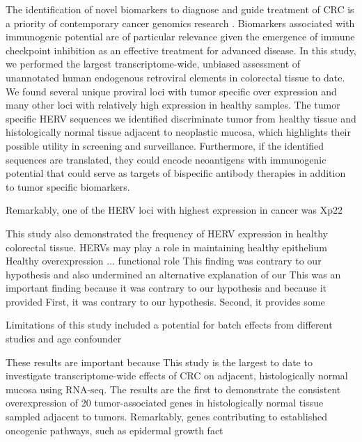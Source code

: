 The identification of novel biomarkers to diagnose and guide treatment of CRC is a priority of contemporary cancer genomics research \citep{Sveen2019}.
Biomarkers associated with immunogenic potential are of particular relevance given the emergence of immune checkpoint inhibition as an effective treatment for advanced disease.
In this study, we performed the largest transcriptome-wide, unbiased assessment of unannotated human endogenous retroviral elements in colorectal tissue to date.
We found several unique proviral loci with tumor specific over expression and many other loci with relatively high expression in healthy samples.
The tumor specific HERV sequences we identified discriminate tumor from healthy tissue and histologically normal tissue adjacent to neoplastic mucosa, which highlights their possible utility in screening and surveillance.
Furthermore, if the identified sequences are translated, they could encode neoantigens with immunogenic potential that could serve as targets of bispecific antibody therapies in addition to tumor specific biomarkers.

Remarkably, one of the HERV loci with highest expression in cancer was Xp22

This study also demonstrated the frequency of HERV expression in healthy colorectal tissue.
HERVs may play a role in maintaining healthy epithelium
Healthy overexpression ... functional role
This finding was contrary to our hypothesis and also undermined an alternative explanation of our
This was an important finding because it was contrary to our hypothesis and because it provided
First, it was contrary to our hypothesis.
Second, it provides some

Limitations of this study included a potential for batch effects from different studies and age confounder

These results are important because
This study is the largest to date to investigate transcriptome-wide effects of CRC on adjacent, histologically normal mucosa using RNA-seq.
The results are the first to demonstrate the consistent overexpression of 20 tumor-associated genes in histologically normal tissue sampled adjacent to tumors.
Remarkably, genes contributing to established oncogenic pathways, such as epidermal growth fact
